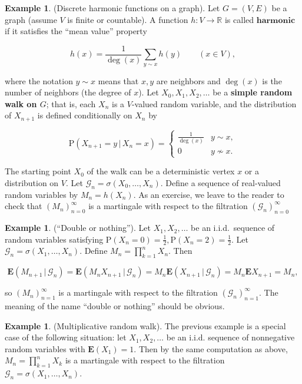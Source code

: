 \documentclass[11pt]{report}
\newcommand{\R}{\mathbb{R}}
\theoremstyle{plain}
\theoremstyle{definition}
\newtheorem{example}[thm]{Example}
\begin{document}
\begin{example}
(Discrete harmonic functions on a graph). Let $G=(V,E)$ be a graph (assume $V$ is finite or countable). A function $h:V\to\R$ is called $\textbf{harmonic}$ if it satisfies the ``mean value'' property

\[
h(x) = \frac{1}{\operatorname{deg}(x)}\sum_{y \sim x} h(y) \qquad (x\in V),
\]

where the notation $y\sim x$ means that $x,y$ are neighbors and $\operatorname{deg}(x)$ is the number of neighbors (the degree of $x$). Let $X_0,X_1,X_2,\ldots$ be a \textbf{simple random walk on $G$}; that is, each $X_n$ is a $V$-valued random variable, and the distribution of $X_{n+1}$ is defined conditionally on $X_n$ by

\[
\mathrm{P}(X_{n+1} = y\,|\,X_n=x) = \begin{cases} \frac{1}{\operatorname{deg}(x)} & y\sim x, \\ 0 & y\nsim x.
\end{cases}
\]

The starting point $X_0$ of the walk can be a deterministic vertex $x$ or a distribution on $V$. Let $\mathcal{G}_n=\sigma(X_0,\ldots,X_n)$. Define a sequence of real-valued random variables by $M_n = h(X_n)$. As an exercise, we leave to the reader to check that $(M_n)_{n=0}^\infty$ is a martingale with respect to the filtration $(\mathcal{G}_n)_{n=0}^\infty$
\end{example}

\begin{example}
(``Double or nothing''). Let $X_1,X_2,\ldots$ be an i.i.d.\ sequence of random variables satisfying $\mathrm{P}(X_n = 0) = \tfrac12, \mathrm{P}(X_n = 2) = \tfrac12$. Let $\mathcal{G}_n=\sigma(X_1,\ldots,X_n)$. Define $M_n = \prod_{k=1}^n X_n$. Then

\[
\mathbf{E}\left(M_{n+1}\,|\,\mathcal{G}_{n}\right) = \mathbf{E}\left(M_{n} X_{n+1}\,|\,\mathcal{G}_n\right) = M_{n} \mathbf{E}\left(X_{n+1}\,|\,\mathcal{G}_n\right) = M_{n} \mathbf{E}{X_{n+1}} = M_n,
\]

so $(M_n)_{n=1}^\infty$ is a martingale with respect to the filtration $(\mathcal{G}_n)_{n=1}^\infty$. The meaning of the name ``double or nothing'' should be obvious.
\end{example}

\begin{example}
(Multiplicative random walk). The previous example is a special case of the following situation: let $X_1, X_2, \ldots$ be an i.i.d. sequence of nonnegative random variables with $\mathbf{E}(X_1)=1$. Then by the same computation as above, $M_n = \prod_{k=1}^n X_k$ is a martingale with respect to the filtration $\mathcal{G}_n = \sigma(X_1,\ldots,X_n)$.
\end{example}
\end{document}
